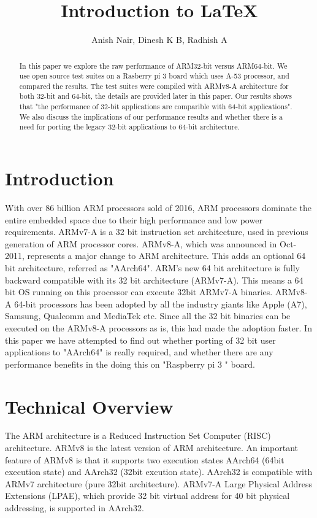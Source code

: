 \documentclass[journal]{IEEEtran}
\begin{document}
\title{Introduction to \LaTeX{}}
\author{Anish Nair, Dinesh K B, Radhish A}

\maketitle

\begin{abstract}
In this paper we explore the raw performance of ARM32-bit versus ARM64-bit.  We use open source test suites on a Rasberry pi 3 board which uses A-53 processor, and compared the results.  The test suites were compiled with ARMv8-A architecture for both 32-bit and 64-bit, the details are provided later in this paper.  Our results shows that "the performance of 32-bit applications are comparible with 64-bit applications".  We also discuss the implications of our performance results and whether there is a need for porting the legacy 32-bit applications to 64-bit architecture.
\end{abstract}

\section{Introduction}
With over 86 billion ARM processors sold of 2016, ARM processors dominate the entire embedded space due to their high performance and low power requirements.  ARMv7-A is a 32 bit instruction set architecture, used in previous generation of ARM processor cores.  ARMv8-A, which was announced in Oct-2011, represents a major change to ARM architecture.  This adds an optional 64 bit architecture, referred as "AArch64". ARM's new 64 bit architecture is fully backward compatible with its 32 bit architecture (ARMv7-A). This means a 64 bit OS running on this processor can execute 32bit ARMv7-A binaries.  ARMv8-A 64-bit processors has been adopted by all the industry giants like Apple (A7), Samsung, Qualcomm and MediaTek etc.  Since all the 32 bit binaries can be executed on the ARMv8-A processors as is, this had made the adoption faster.  In this paper we have attempted to find out whether porting of 32 bit user applications to "AArch64" is really required, and whether there are any performance benefits in the doing this on "Raspberry pi 3 " board.


\section{Technical Overview}

The ARM architecture is a Reduced Instruction Set Computer (RISC) architecture. ARMv8 is the latest version of ARM architecture.  An important feature of ARMv8 is that it supports two execution states AArch64 (64bit execution state) and AArch32 (32bit excution state).  AArch32 is compatible with ARMv7 architecture (pure 32bit architecture).  ARMv7-A Large Physical Address Extensions (LPAE), which provide 32 bit virtual address for 40 bit physical addressing, is supported in AArch32.
\end{document}
